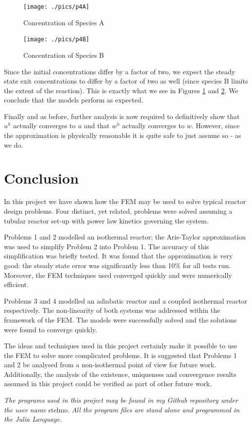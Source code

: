 \documentclass[11pt,fleqn]{article}
\theoremstyle{defstyle}
\begin{document}
\begin{figure}[H] 
\centering
\texttt{[image: ./pics/p4A]}
\caption{Concentration of Species A} 
\label{fig_p4A}
\end{figure}
\begin{figure}[H] 
\centering
\texttt{[image: ./pics/p4B]}
\caption{Concentration of Species B} 
\label{fig_p4B}
\end{figure}
Since the initial concentrations differ by a factor of two, we expect the steady state exit concentrations to differ by a factor of two as well (since species B limits the extent of the reaction). This is exactly what we see in Figures \ref{fig_p4A} and \ref{fig_p4B}. We conclude that the models perform as expected.

Finally and as before, further analysis is now required to definitively show that $u^h$ actually converges to $u$ and that $w^h$ actually converges to $w$. However, since the approximation is physically reasonable it is quite safe to just assume so - as we do.

\section{Conclusion}
In this project we have shown how the FEM may be used to solve typical reactor design problems. Four distinct, yet related, problems were solved assuming a tubular reactor set-up with power law kinetics governing the system.

Problems 1 and 2 modelled an isothermal reactor; the Aris-Taylor approximation was used to simplify Problem 2 into Problem 1. The accuracy of this simplification was briefly tested. It was found that the approximation is very good: the steady state error was significantly less than 10\% for all tests run. Moreover, the FEM techniques used converged quickly and were numerically efficient.

Problems 3 and 4 modelled an adiabatic reactor and a coupled isothermal reactor respectively. The non-linearity of both systems was addressed within the framework of the FEM. The models were successfully solved and the solutions were found to converge quickly. 

The ideas and techniques used in this project certainly make it possible to use the FEM to solve more complicated problems. It is suggested that Problems 1 and 2 be analysed from a non-isothermal point of view for future work. Additionally, the analysis of the existence, uniqueness and convergence results assumed in this project could be verified as part of other future work. 

\textit{The programs used in this project may be found in my Github repository under the user name} stelmo. \textit{All the program files are stand alone and programmed in the Julia Language.}


\newpage


\end{document}
